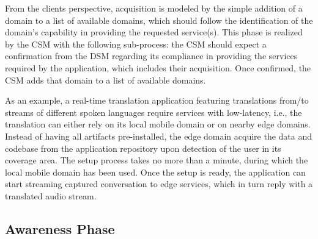 From the clients perspective, acquisition is modeled by the simple addition of a domain to a list of available domains, which should follow the identification of the domain's capability in providing the requested service(s). This phase is realized by the CSM with the following sub-process: the CSM should expect a confirmation from the DSM regarding its compliance in providing the services required by the application, which includes their acquisition. Once confirmed, the CSM adds that domain to a list of available domains. 

As an example, a real-time translation application featuring translations from/to streams of different spoken languages require services with low-latency, i.e., the translation can either rely on its local mobile domain or on nearby edge domains. Instead of having all artifacts pre-installed, the edge domain acquire the data and codebase from the application repository upon detection of the user in its coverage area. The setup process takes no more than a minute, during which the local mobile domain has been used. Once the setup is ready, the application can start streaming captured conversation to edge services, which in turn reply with a translated audio stream.





\subsection{Awareness Phase}\label{sec:A3-E-awareness}



